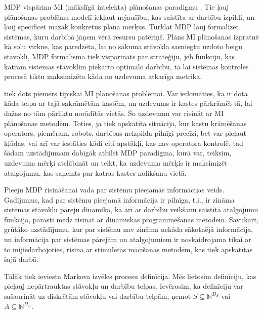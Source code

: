 \documentclass{ludis} %
\begin{document}
MDP vispārina MI (mākslīgā intelekta) plānošanas paradigmu \autocite{Hendler1990ai}.
Tie ļauj plānošanas problēmu modelī iekļaut nejaušību, kas saistīta ar darbību izpildi, un ļauj specificēt mazāk konkrētus plāna mērķus.
Turklāt MDP ļauj formalizēt sistēmas, kuru darbībā jāņem vērā resursu patēriņš.
Plāns MI plānošanas izpratnē kā soļu virkne, kas paredzēta, lai no sākuma stāvokļa sasniegtu uzdoto beigu stāvokli, MDP formālismā tiek vispārināts par stratēģiju, jeb funkciju, kas katram sistēmas stāvoklim piekārto optimālo darbību, tā lai sistēmas kontroles procesā tiktu maksimizēta kāda no uzdevuma atkarīga metrika.

\autocite{Otterlo} tiek dots piemērs tipiskai MI plānošanas problēmai. Var iedomāties, ka ir dota kāda telpa ar tajā sakrāmētām kastēm, un uzdevums ir kastes pārkrāmēt tā, lai dažas no tām pārliktu norādītās vietās.
Šo uzdevumu var risināt ar MI plānošanas metodēm.
Toties, ja tiek apskatīta situācija, kur kastu krāmēšanas operators, piemēram, robots, darbības neizpilda pilnīgi precīzi, bet var pieļaut kļūdas, vai arī var iestāties kādi citi apstākļi, kas nav operatora kontrolē, tad šādam uzstādījumam dabīgāk atbilst MDP paradigma, kurā var, teiksim, uzdevuma mērķi atslābināt un teikt, ka uzdevuma mērķis ir maksimizēt atalgojumu, kas saņemts par katras kastes nolikšanu vietā.

Pieeju MDP risināšanai vada par sistēmu pieejamās informācijas veids.
Gadījumus, kad par sistēmu pieejamā informācija ir pilnīga, t.i., ir zināma sistēmas stāvokļu pāreju dinamika, kā arī ar darbību veikšanu saistītā atalgojumu funkcija, parasti mēdz risināt ar dinamiskās programmēšanas metodēm.
Savukārt, grūtāko uzstādījumu, kur par sistēmu nav zināma nekāda sākotnējā informācija, un informācija par sistēmas pārejām un atalgojumiem ir noskaidrojama tikai ar to mijiedarbojoties, risina ar stimulētās mācīšanās metodēm, kas tiek apskatītas šajā darbā.

Tālāk tiek ieviesta Markova izvēles procesu definīcija. Mēs lietosim definīciju, kas pieļauj nepārtrauktas stāvokļu un darbību telpas. Ievērosim, ka definīciju var sašaurināt uz diskrētām stāvokļu vai darbību telpām, ņemot $S \subseteq \mathbb{N}^{D_S}$ vai $A \subseteq \mathbb{N}^{D_A}$.
\end{document}
